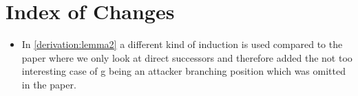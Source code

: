 \section{Index of Changes}

\begin{itemize}
    \item  In \ref{derivation:lemma2} a different kind of induction is used compared to the paper 
where we only look at direct successors and therefore added the not too interesting case of g being an 
attacker branching position which was omitted in the paper.
\end{itemize}
